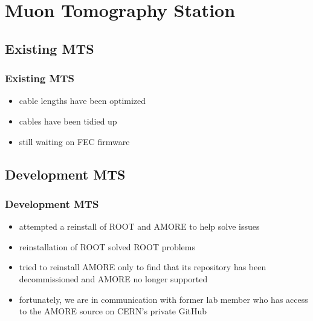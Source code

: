 \documentclass[aspectratio=169]{beamer}
\begin{document}

\section{Muon Tomography Station}


\subsection{Existing MTS}

\begin{frame}

  \frametitle{Existing MTS}

  \begin{itemize}
    \item cable lengths have been optimized
    \item cables have been tidied up
    \item still waiting on FEC firmware
  \end{itemize}


\end{frame}



\subsection{Development MTS}

\begin{frame}

  \frametitle{Development MTS}

  \begin{itemize}
    \item attempted a reinstall of ROOT and AMORE to help solve issues
    \item reinstallation of ROOT solved ROOT problems
    \item tried to reinstall AMORE only to find that its repository has been
      decommissioned and AMORE no longer supported
    \item fortunately, we are in communication with former lab member who has
      access to the AMORE source on CERN's private GitHub
  \end{itemize}


\end{frame}
\end{document}
